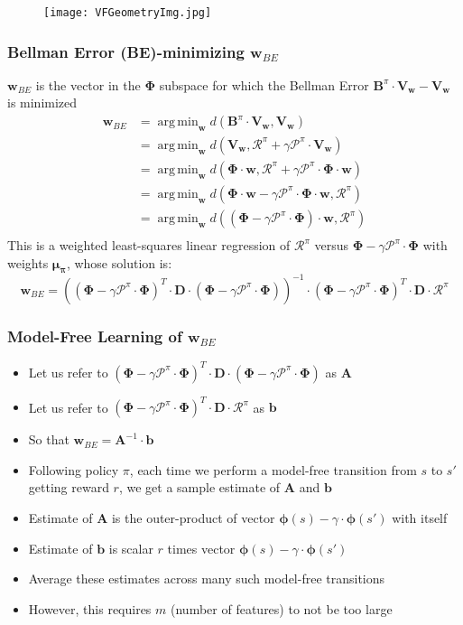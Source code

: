 \documentclass[handout]{beamer}
\DeclareMathOperator*{\argmin}{arg\,min}
\newcommand{\vw}{\bm{V_w}}
\newcommand{\bphi}{\bm{\Phi}}
\newcommand{\bb}{\bm{B}^{\pi}}
\newcommand{\bmu}{\bm{\mu_{\pi}}}
\newcommand{\bd}{\bm{D}}
\newcommand{\bw}{\bm{w}}
\newcommand{\brew}{\bm{\mathcal{R}}^{\pi}}
\newcommand{\bprob}{\bm{\mathcal{P}}^{\pi}}
\begin{document}
\begin{frame}
\begin{figure}
\texttt{[image: VFGeometryImg.jpg]}
\end{figure}
\end{frame}

\begin{frame}
\frametitle{Bellman Error (BE)-minimizing $\bm{w}_{BE}$}
\pause
$\bm{w}_{BE}$ is the vector in the $\bphi$ subspace for which the Bellman Error $\bb \cdot \vw - \vw$ is minimized
\begin{align*}
\bm{w}_{BE} & =  \argmin_{\bw} d(\bb \cdot \vw, \vw) \\
& = \argmin_{\bw} d(\vw, \brew + \gamma \bprob \cdot \vw) \\
& = \argmin_{\bw} d(\bphi \cdot \bw, \brew + \gamma \bprob \cdot \bphi \cdot \bw)\\
& = \argmin_{\bw} d(\bphi \cdot \bw - \gamma \bprob \cdot \bphi \cdot \bw, \brew)\\
& = \argmin_{\bw} d((\bphi - \gamma \bprob \cdot \bphi) \cdot \bw, \brew )\\
\end{align*}
\pause
This is a weighted least-squares linear regression of $\brew$ versus $\bphi - \gamma \bprob \cdot \bphi$
with weights $\bmu$, whose solution is:
\pause
$$\bm{w}_{BE} = ((\bphi - \gamma \bprob \cdot \bphi)^T \cdot \bd \cdot (\bphi - \gamma \bprob \cdot \bphi))^{-1} \cdot (\bphi - \gamma \bprob \cdot \bphi)^T \cdot \bd \cdot \brew$$
\end{frame}

\begin{frame}
\frametitle{Model-Free Learning of $\bm{w}_{BE}$}
\pause
\begin{itemize}[<+->]
\item Let us refer to $(\bphi - \gamma \bprob \cdot \bphi)^T \cdot \bd \cdot (\bphi - \gamma \bprob \cdot \bphi)$ as $\bm{A}$
\item Let us refer to $(\bphi - \gamma \bprob \cdot \bphi)^T \cdot \bd \cdot \brew$ as $\bm{b}$ 
\item So that $\bm{w}_{BE} = \bm{A}^{-1} \cdot \bm{b}$
\item Following policy $\pi$, each time we perform a model-free transition from $s$ to $s'$ getting reward $r$, we get a sample estimate of $\bm{A}$ and $\bm{b}$
\item Estimate of $\bm{A}$ is the outer-product of vector $\bm{\phi}(s) - \gamma \cdot \bm{\phi}(s')$ with itself
\item Estimate of $\bm{b}$ is scalar $r$ times vector $\bm{\phi}(s) - \gamma \cdot \bm{\phi}(s')$ 
\item Average these estimates across many such model-free transitions
\item However, this requires $m$ (number of features) to not be too large
\end{itemize}
\end{frame}
\end{document}
